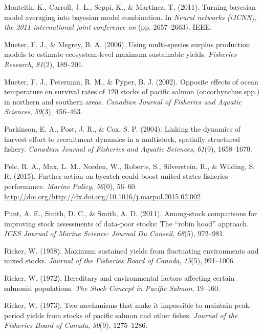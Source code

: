 \documentclass[12pt,]{scrartcl}
\begin{document}
\hypertarget{ref-monteith2011turning}{}
Monteith, K., Carroll, J. L., Seppi, K., \& Martinez, T. (2011). Turning
bayesian model averaging into bayesian model combination. In
\emph{Neural networks (iJCNN), the 2011 international joint conference
on} (pp. 2657--2663). IEEE.

\hypertarget{ref-mueter2006using}{}
Mueter, F. J., \& Megrey, B. A. (2006). Using multi-species surplus
production models to estimate ecosystem-level maximum sustainable
yields. \emph{Fisheries Research}, \emph{81}(2), 189--201.

\hypertarget{ref-mueter2002opposite}{}
Mueter, F. J., Peterman, R. M., \& Pyper, B. J. (2002). Opposite effects
of ocean temperature on survival rates of 120 stocks of pacific salmon
(oncorhynchus spp.) in northern and southern areas. \emph{Canadian
Journal of Fisheries and Aquatic Sciences}, \emph{59}(3), 456--463.

\hypertarget{ref-parkinson2004linking}{}
Parkinson, E. A., Post, J. R., \& Cox, S. P. (2004). Linking the
dynamics of harvest effort to recruitment dynamics in a multistock,
spatially structured fishery. \emph{Canadian Journal of Fisheries and
Aquatic Sciences}, \emph{61}(9), 1658--1670.

\hypertarget{ref-Pelc201556}{}
Pelc, R. A., Max, L. M., Norden, W., Roberts, S., Silverstein, R., \&
Wilding, S. R. (2015). Further action on bycatch could boost united
states fisheries performance. \emph{Marine Policy}, \emph{56}(0),
56--60.
\url{http://doi.org/http://dx.doi.org/10.1016/j.marpol.2015.02.002}

\hypertarget{ref-punt2011among}{}
Punt, A. E., Smith, D. C., \& Smith, A. D. (2011). Among-stock
comparisons for improving stock assessments of data-poor stocks: The
``robin hood'' approach. \emph{ICES Journal of Marine Science: Journal
Du Conseil}, \emph{68}(5), 972--981.

\hypertarget{ref-ricker1958maximum}{}
Ricker, W. (1958). Maximum sustained yields from fluctuating
environments and mixed stocks. \emph{Journal of the Fisheries Board of
Canada}, \emph{15}(5), 991--1006.

\hypertarget{ref-ricker1972hereditary}{}
Ricker, W. (1972). Hereditary and environmental factors affecting
certain salmonid populations. \emph{The Stock Concept in Pacific
Salmon}, 19--160.

\hypertarget{ref-ricker1973two}{}
Ricker, W. (1973). Two mechanisms that make it impossible to maintain
peak-period yields from stocks of pacific salmon and other fishes.
\emph{Journal of the Fisheries Board of Canada}, \emph{30}(9),
1275--1286.
\end{document}
